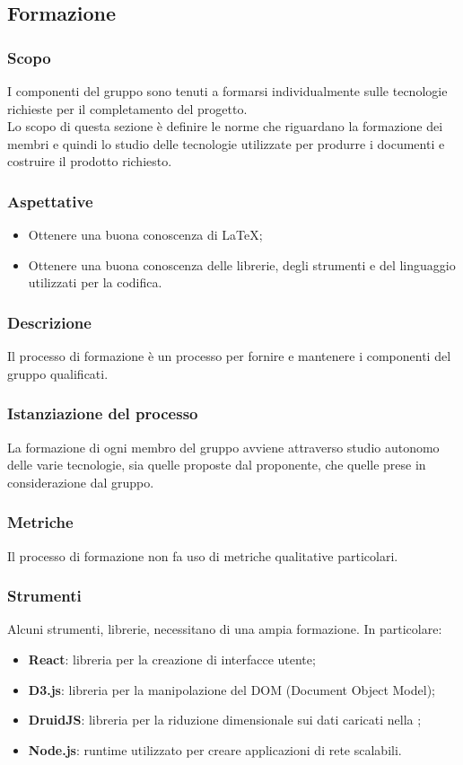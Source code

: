 \subsection{Formazione}

\subsubsection{Scopo}
I componenti del gruppo \Gruppo{} sono tenuti a formarsi individualmente sulle tecnologie richieste per il completamento del progetto.\\
Lo scopo di questa sezione è definire le norme che riguardano la formazione dei membri e quindi lo studio delle tecnologie utilizzate per produrre i documenti e costruire il prodotto richiesto. 

\subsubsection{Aspettative}
\begin{itemize}
	\item Ottenere una buona conoscenza di \LaTeX{};
	\item Ottenere una buona conoscenza delle librerie, degli strumenti e del linguaggio utilizzati per la codifica.
\end{itemize}

\subsubsection{Descrizione}
Il processo di formazione è un processo per fornire e mantenere i componenti del gruppo qualificati.

\subsubsection{Istanziazione del processo}
La formazione di ogni membro del gruppo avviene attraverso studio autonomo delle varie tecnologie, sia quelle proposte dal proponente, che quelle prese in considerazione dal gruppo. 

\subsubsection{Metriche}
Il processo di formazione non fa uso di metriche qualitative particolari. 

\subsubsection{Strumenti}
Alcuni strumenti, librerie,  necessitano di una ampia formazione. In particolare:
\begin{itemize}
	\item \textbf{React}: libreria  per la creazione di interfacce utente;
	\item \textbf{D3.js}: libreria per la manipolazione del DOM (Document Object Model);
	\item \textbf{DruidJS}: libreria per la riduzione dimensionale sui dati caricati nella ;
	\item \textbf{Node.js}: runtime  utilizzato per creare applicazioni di rete scalabili.
\end{itemize}